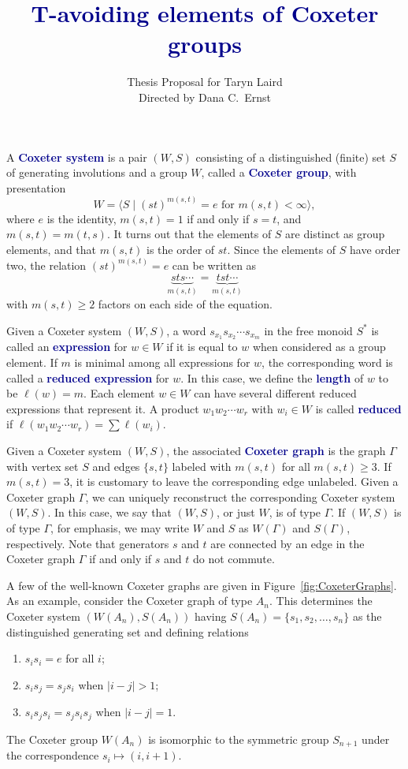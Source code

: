 \documentclass[10pt]{amsart}
\newcommand{\alert}[1]{\textcolor{darkblue}{\textbf{#1}}}
\begin{document}
\title{\alert{T-avoiding elements of Coxeter groups}}
\author{Thesis Proposal for Taryn Laird\\
Directed by Dana C.~Ernst}
 
\maketitle

A \alert{Coxeter system} is a pair $(W,S)$ consisting of a distinguished (finite) set $S$ of generating involutions and a group $W$, called a \alert{Coxeter group}, with presentation
\[
W = \langle S \mid (st)^{m(s, t)} = e \text{ for } m(s, t) < \infty \rangle,
\]
where $e$ is the identity, $m(s,t) = 1$ if and only if $s = t$, and $m(s,t) = m(t,s)$. It turns out that the elements of $S$ are distinct as group elements, and that $m(s, t)$ is the order of $st$.  Since the elements of $S$ have order two, the relation $(st)^{m(s,t)} = e$ can be written as
\[
\underbrace{sts \cdots}_{m(s,t)} = \underbrace{tst \cdots}_{m(s,t)}
\]
with $m(s,t) \geq 2$ factors on each side of the equation.

Given a Coxeter system $(W,S)$, a word $s_{x_1}s_{x_2}\cdots s_{x_m}$ in the free monoid $S^*$ is called an \alert{expression} for $w\in W$ if it is equal to $w$ when considered as a group element. If $m$ is minimal among all expressions for $w$, the corresponding word is called a \alert{reduced expression} for $w$. In this case, we define the \alert{length} of $w$ to be $\ell(w)=m$. Each element $w \in W$ can have several different reduced expressions that represent it.  A product $w_{1}w_{2}\cdots w_{r}$ with $w_{i} \in W$ is called \alert{reduced} if $\ell(w_{1}w_{2}\cdots w_{r})=\sum \ell(w_{i})$.

Given a Coxeter system $(W,S)$, the associated \alert{Coxeter graph} is the graph $\Gamma$ with vertex set $S$ and edges $\{s,t\}$ labeled with $m(s,t)$ for all $m(s,t)\geq 3$.  If $m(s,t)=3$, it is customary to leave the corresponding edge unlabeled.  Given a Coxeter graph $\Gamma$, we can uniquely reconstruct the corresponding Coxeter system $(W,S)$.  In this case, we say that $(W,S)$, or just $W$, is of type $\Gamma$. If $(W,S)$ is of type $\Gamma$, for emphasis, we may write $W$ and $S$ as $W(\Gamma)$ and $S(\Gamma)$, respectively.  Note that generators $s$ and $t$ are connected by an edge in the Coxeter graph $\Gamma$ if and only if $s$ and $t$ do not commute. 

A few of the well-known Coxeter graphs are given in Figure~\ref{fig:CoxeterGraphs}. As an example, consider the Coxeter graph of type $A_n$. This determines the Coxeter system $(W(A_n),S(A_n))$ having $S(A_n) = \{s_1, s_2, \ldots, s_n\}$ as the distinguished generating set and defining relations
\begin{enumerate}
\item $s_is_i = e$ for all $i$;
\item $s_is_j = s_js_i$ when $|i-j| > 1$;
\item $s_is_js_i = s_js_is_j$ when $|i-j| = 1$.
\end{enumerate}
The Coxeter group $W(A_n)$ is isomorphic to the symmetric group $S_{n+1}$ under the correspondence $s_i\mapsto (i,i+1)$.
\end{document}
